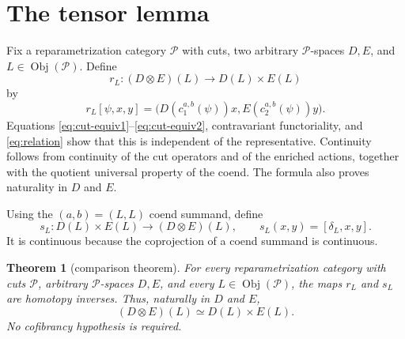 \documentclass[12pt,a4paper]{amsart}
\newcommand{\Pcat}{\mathcal P}
\newcommand{\Obj}{\operatorname{Obj}}
\newtheorem{thm}{Theorem}[section]
\theoremstyle{definition}
\begin{document}
\section{The tensor lemma}
\label{sec:5}


Fix a reparametrization category \(\Pcat\) with cuts, two arbitrary \(\Pcat\)-spaces \(D,E\), and \(L\in\Obj(\Pcat)\).  Define
\begin{equation}\label{eq:common-r}
 r_L:(D\otimes E)(L)\longrightarrow D(L)\times E(L)
\end{equation}
by
\begin{equation}\label{eq:common-r-formula}
 r_L[\psi,x,y]=
 \bigl(D(c^{a,b}_1(\psi))x,E(c^{a,b}_2(\psi))y\bigr).
\end{equation}
Equations \eqref{eq:cut-equiv1}--\eqref{eq:cut-equiv2}, contravariant functoriality, and \eqref{eq:relation} show that this is independent of the representative.  Continuity follows from continuity of the cut operators and of the enriched actions, together with the quotient universal property of the coend. The formula also proves naturality in \(D\) and \(E\).

Using the \((a,b)=(L,L)\) coend summand, define
\begin{equation}\label{eq:common-s}
 s_L: D(L)\times E(L)\longrightarrow(D\otimes E)(L),\qquad
 s_L(x,y)=[\delta_L,x,y].
\end{equation}
It is continuous because the coprojection of a coend summand is continuous.

\begin{thm}[comparison theorem]\label{thm:common-comparison}
For every reparametrization category with cuts \(\Pcat\), arbitrary \(\Pcat\)-spaces \(D,E\), and every \(L\in\Obj(\Pcat)\), the maps \(r_L\) and \(s_L\) are homotopy inverses.  Thus, naturally in \(D\) and \(E\),
\[
 (D\otimes E)(L)\simeq D(L)\times E(L).
\]
No cofibrancy hypothesis is required.
\end{thm}
\end{document}
